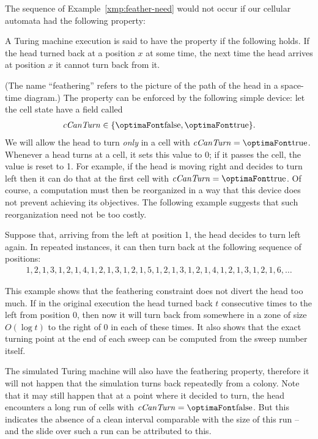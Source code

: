 \documentclass[12pt]{memoir}
\newcommand{\fld}[1]{\ensuremath{\textit{#1\/}}}
\newcommand{\cCanTurn}{\fld{cCanTurn}}
\begin{document}
The sequence of Example~\ref{xmp:feather-need} would not occur if
our cellular automata had the following property:

\begin{definition}[Feathering]\label{def:feathering}
A Turing machine execution is said to have the  property if the following holds.
If the head turned back at a position \( x \) at some time, 
the next time the head arrives at position \( x \) it cannot turn back from it.
\end{definition}

(The name ``feathering'' refers to the picture of the path of the head in a space-time diagram.)
The property can be enforced by the following simple
device: let the cell state have a field called
\begin{align*}
   \cCanTurn\in\{ \false,\true \}.
 \end{align*}
We will allow the head to turn \emph{only} in a cell with \( \cCanTurn=\true \).
Whenever a head turns at a cell, it sets this value to 0; if  it passes the cell, the value 
is reset to 1.
For example, if the head is moving right and decides to turn left then
it can do that at the first cell with \( \cCanTurn=\true \).
Of course, a computation must then be reorganized in a way that this device
does not prevent achieving its objectives.
The following example suggests that such reorganization need not be too costly.

\begin{example}[Feathering]\label{xmp:feathering}
Suppose that, arriving from the left at position 1, the head decides to turn left again.
In repeated instances, it can then turn back at the following sequence of positions:
\begin{align*}
 1, 2, 1, 3, 1, 2, 1, 4, 1, 2, 1, 3, 1, 2, 1, 5, 1, 2, 1, 3, 1, 2, 1, 4, 1, 2, 1, 3, 1, 2, 1, 6, \dots
 \end{align*}
\end{example}

This example shows that the feathering constraint does not divert the head
too much.
If in the original execution the head turned back \( t \) consecutive
times to the left from position 0, then now it will 
turn back from somewhere in a zone of size \( O(\log t) \) to the right of 0 in 
each of these times.
It also shows that the exact turning point at the end of each sweep
can be computed from the sweep number itself.

The simulated Turing machine will also have the feathering property,
therefore it will not happen that the simulation turns back repeatedly from a colony.
Note that it may still happen that at a point where it decided to turn, 
the head encounters a long run of cells with \( \cCanTurn=\false \).
But this indicates the absence of a clean interval comparable with the size of this 
run -- and the slide over such a run can be attributed to this.
\end{document}
